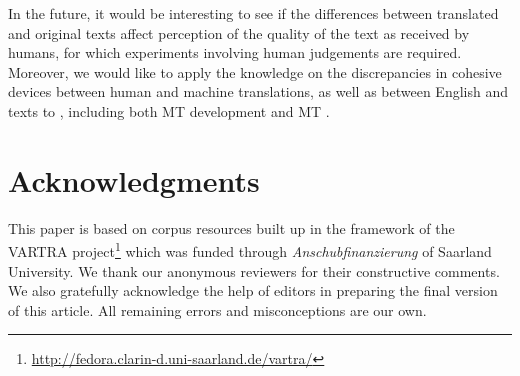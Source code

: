 \documentclass[output=paper]{langsci/langscibook.cls}
\begin{document}

In the future, it would be interesting to see if the differences between translated and original texts affect perception of the quality of the text as received by humans, for which experiments involving human judgements are required. Moreover, we would like to apply the knowledge on the discrepancies in cohesive devices between human and machine translations, as well as between English and  texts to , including both MT development and MT .



\section*{Acknowledgments}

This paper is based on corpus resources built up in the framework of the VARTRA project\footnote{\url{http://fedora.clarin-d.uni-saarland.de/vartra/}} which was funded through  \textsl{Anschubfinanzierung} of Saarland University. We thank our anonymous reviewers for their constructive comments. We also gratefully acknowledge the help of editors in preparing the final version of this article. All remaining errors and misconceptions are our own.

{\sloppy
\printbibliography[heading=subbibliography,notkeyword=this] 
}

%
%
\end{document}
